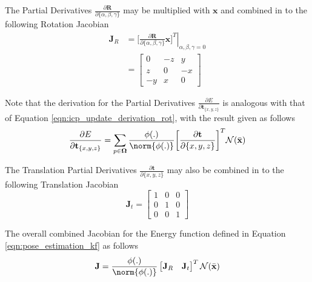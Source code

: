The Partial Derivatives
$\frac{\partial \mathbf{R}}{\partial \{\alpha, \beta, \gamma\}}$ may be
multiplied with $\mathbf{x}$ and combined in to the following Rotation Jacobian
\begin{equation}
  \label{eqn:rot_jac}
  \begin{split}
    \mathbf{J}_{R} & = \left. \bigg[
      \frac{\partial \mathbf{R}}{\partial \{\alpha, \beta, \gamma\}} \mathbf{x}
      \bigg]^{T} \right\vert_{\alpha,\beta,\gamma = 0} \\
    & =
    \begin{bmatrix}
      0 & -z & y \\
      z & 0 & -x \\
      -y & x & 0
    \end{bmatrix}
  \end{split}
\end{equation}

Note that the derivation for the Partial Derivatives
$\frac{\partial E}{\partial \mathbf{t}_{\{x, y, z\}}}$ is analogous with that of
Equation \ref{eqn:icp_update_derivation_rot}, with the result given as follows
\begin{equation}
  \label{eqn:icp_update_derivation_trans}
  \frac{\partial E}{\partial \mathbf{t}_{\{x, y, z\}}} =
  \sum_{p \in \mathbf{\Omega}}
  \frac{\phi(.)}{\norm{\phi(.)}}
  \bigg[ \frac{\partial \mathbf{t}}{\partial \{x, y, z\}}\bigg]^{T}
  \mathcal{N}(\bar{\mathbf{x}})
\end{equation}

The Translation Partial Derivatives
$\frac{\partial \mathbf{t}}{\partial \{x, y, z\}}$ may also be combined in to
the following Translation Jacobian
\begin{equation}
  \label{eqn:trans_jac}
  \mathbf{J}_{t} =
  \begin{bmatrix}
    1 & 0 & 0 \\
    0 & 1 & 0 \\
    0 & 0 & 1
  \end{bmatrix}
\end{equation}

The overall combined Jacobian for the Energy function defined in Equation
\ref{eqn:pose_estimation_kf} as follows
\begin{equation}
  \label{eqn:pose_jacobian}
  \mathbf{J} =
  \frac{\phi(.)}{\norm{\phi(.)}}
  \begin{bmatrix}
    \mathbf{J}_{R} & \mathbf{J}_{t}
  \end{bmatrix}^{T}
  \mathcal{N}(\bar{\mathbf{x}})
\end{equation}

